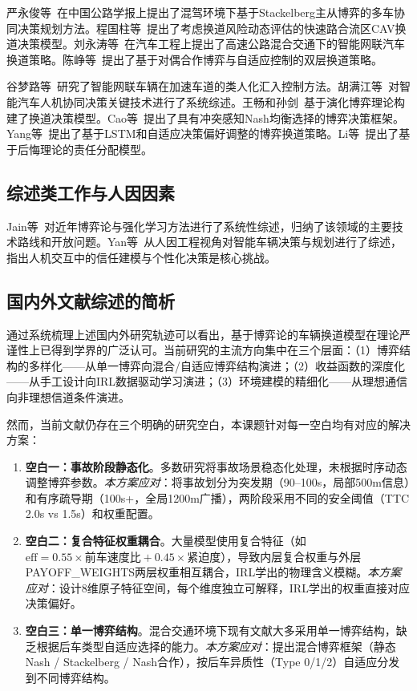 严永俊等~\cite{yan2024stackelberg}在中国公路学报上提出了混驾环境下基于Stackelberg主从博弈的多车协同决策规划方法。程国柱等~\cite{cheng2025cav}提出了考虑换道风险动态评估的快速路合流区CAV换道决策模型。刘永涛等~\cite{liu2024highway}在汽车工程上提出了高速公路混合交通下的智能网联汽车换道策略。陈峥等~\cite{chen2025dual}提出了基于对偶合作博弈与自适应控制的双层换道策略。

谷梦路等~\cite{gu2024humanlike}研究了智能网联车辆在加速车道的类人化汇入控制方法。胡满江等~\cite{hu2024review}对智能汽车人机协同决策关键技术进行了系统综述。王畅和孙剑~\cite{wang2021evolutionary}基于演化博弈理论构建了换道决策模型。Cao等~\cite{cao2025game}提出了具有冲突感知Nash均衡选择的博弈决策框架。Yang等~\cite{yang2026lane}提出了基于LSTM和自适应决策偏好调整的博弈换道策略。Li等~\cite{li2025responsibility}提出了基于后悔理论的责任分配模型。

\subsection{综述类工作与人因因素}
Jain等~\cite{jain2024recent}对近年博弈论与强化学习方法进行了系统性综述，归纳了该领域的主要技术路线和开放问题。Yan等~\cite{yan2026decision}从人因工程视角对智能车辆决策与规划进行了综述，指出人机交互中的信任建模与个性化决策是核心挑战。

\subsection{国内外文献综述的简析}
通过系统梳理上述国内外研究轨迹可以看出，基于博弈论的车辆换道模型在理论严谨性上已得到学界的广泛认可。当前研究的主流方向集中在三个层面：（1）博弈结构的多样化——从单一博弈向混合/自适应博弈结构演进；（2）收益函数的深度化——从手工设计向IRL数据驱动学习演进；（3）环境建模的精细化——从理想通信向非理想信道条件演进。

然而，当前文献仍存在三个明确的研究空白，本课题针对每一空白均有对应的解决方案：

\begin{enumerate}
    \item \textbf{空白一：事故阶段静态化}。多数研究将事故场景稳态化处理，未根据时序动态调整博弈参数。\textit{本方案应对}：将事故划分为突发期（90--100s，局部500m信息）和有序疏导期（100s+，全局1200m广播），两阶段采用不同的安全阈值（TTC 2.0s vs 1.5s）和权重配置。
    \item \textbf{空白二：复合特征权重耦合}。大量模型使用复合特征（如 $\text{eff}=0.55\times\text{前车速度比}+0.45\times\text{紧迫度}$），导致内层复合权重与外层PAYOFF\_WEIGHTS两层权重相互耦合，IRL学出的物理含义模糊。\textit{本方案应对}：设计8维原子特征空间，每个维度独立可解释，IRL学出的权重直接对应决策偏好。
    \item \textbf{空白三：单一博弈结构}。混合交通环境下现有文献大多采用单一博弈结构，缺乏根据后车类型自适应选择的能力。\textit{本方案应对}：提出混合博弈框架（静态Nash / Stackelberg / Nash合作），按后车异质性（Type 0/1/2）自适应分发到不同博弈结构。
\end{enumerate}


